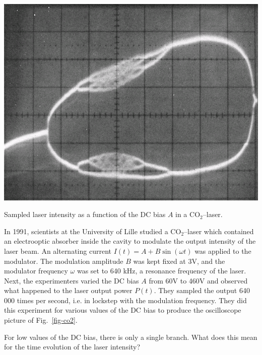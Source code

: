 \begin{marginfigure}
\centering
\includegraphics{dynamic/figures/CO2_chaos}
\caption{Sampled laser intensity as a function of the DC bias $A$ in a CO$_2$--laser.}
\label{fig-co2}
\end{marginfigure}

In 1991, scientists at the University of Lille studied a CO$_2$--laser which contained an electrooptic absorber inside the cavity to modulate the output intensity of the laser beam. An alternating current $I(t)=A+B \sin (\omega t)$ was applied to the modulator. The modulation amplitude $B$ was kept fixed at 3V, and the modulator frequency $\omega$ was set to 640 kHz, a resonance frequency of the laser. Next, the experimenters varied the DC bias $A$ from 60V to 460V and observed what happened to the laser output power $P(t)$. They sampled the output 640 000 times per second, i.e. in lockstep with the modulation frequency. They did this experiment for various values of the DC bias to produce the oscilloscope picture of Fig.~\ref{fig-co2}.

\begin{cue}
For low values of the DC bias, there is only a single branch. What does this mean for the time evolution of the laser intensity?
\end{cue}

